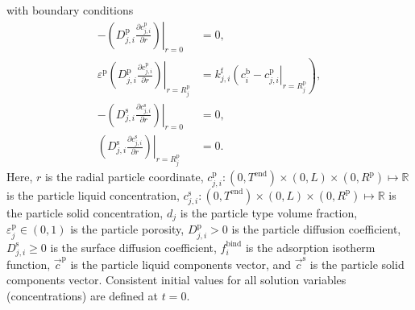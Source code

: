 \documentclass{article}
\begin{document}
with boundary conditions
\begin{align}
- \left. \left( D^{\mathrm{p}}_{j,i} \frac{\partial c^{\mathrm{p}}_{j,i}}{\partial r} \right) \right|_{r=0}
&= 0, \\
\varepsilon^{\mathrm{p}} \left. \left( D^{\mathrm{p}}_{j,i} \frac{\partial c^{\mathrm{p}}_{j,i}}{\partial r} \right)\right|_{r = R^{\mathrm{p}}_{j}}
               &= k^{\mathrm{f}}_{j,i} \left. \left( c^{\mathrm{b}}_i - c^{\mathrm{p}}_{j,i} \right|_{r = R^{\mathrm{p}}_{j}} \right),\\
-\left( \left. D^{\mathrm{s}}_{j,i} \frac{\partial c^{\mathrm{s}}_{j,i}}{\partial r} \right) \right|_{r=0}
&= 0, \\
\left( \left. D^{\mathrm{s}}_{j,i} \frac{\partial c^{\mathrm{s}}_{j,i}}{\partial r} \right) \right|_{r = R^{\mathrm{p}}_{j}}
&= 0.
\end{align}
Here, $r$ is the radial particle coordinate, $c^{\mathrm{p}}_{j,i}\colon  (0, T^\mathrm{end}) \times (0, L)\times (0, R^{\mathrm{p}}) \mapsto \mathbb{R}$ is the particle liquid concentration, $c^{\mathrm{s}}_{j,i}\colon  (0, T^\mathrm{end}) \times (0, L)\times (0, R^{\mathrm{p}}) \mapsto \mathbb{R}$ is the particle solid concentration, $d_j$ is the particle type volume fraction, $\varepsilon^{\mathrm{p}}_{j}\in (0, 1)$ is the particle porosity, $D^\mathrm{p}_{j,i}> 0$ is the particle diffusion coefficient, $D^\mathrm{s}_{j,i}\geq 0$ is the surface diffusion coefficient, $f^\mathrm{bind}_{i}$ is the adsorption isotherm function, $\vec{c}^\mathrm{p}$ is the particle liquid components vector, and $\vec{c}^\mathrm{s}$ is the particle solid components vector.
Consistent initial values for all solution variables (concentrations) are defined at $t = 0$.
\end{document}
